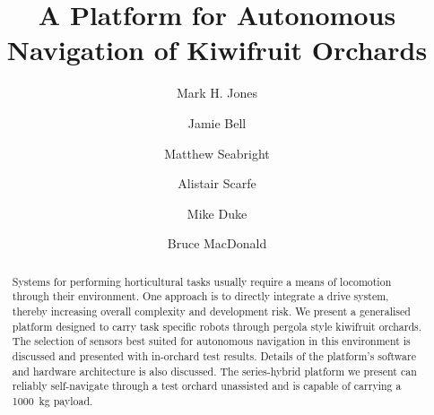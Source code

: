 \documentclass[preprint,authoryear,12pt]{elsarticle}
\begin{document}
\begin{frontmatter}



\title{A Platform for Autonomous Navigation of Kiwifruit Orchards}



\author[UoW]{Mark H. Jones}

\author[UoA]{Jamie Bell}
\author[UoW]{Matthew Seabright}
\author[RPL]{Alistair Scarfe}
\author[UoW]{Mike Duke}
\author[UoA]{Bruce MacDonald}

\address[UoW]{School of Engineering, University of Waikato, Hamilton, New Zealand}
\address[UoA]{Faculty of Engineering, University of Auckland, Auckland, New Zealand}
\address[RPL]{Robotics Plus Ltd, Newnham Innovation Park, Tauranga, New Zealand}

\begin{abstract}
    Systems for performing horticultural tasks usually require a means of locomotion through their environment.
    One approach is to directly integrate a drive system, thereby increasing overall complexity and development risk.
    We present a generalised platform designed to carry task specific robots through pergola style kiwifruit orchards.
    The selection of sensors best suited for autonomous navigation in this environment is discussed and presented with in-orchard test results.
    Details of the platform's software and hardware architecture is also discussed.
    The series-hybrid platform we present can reliably self-navigate through a test orchard unassisted and is capable of carrying a \SI{1000}{\kilo\gram} payload.
\end{abstract}


\end{frontmatter}
\end{document}
